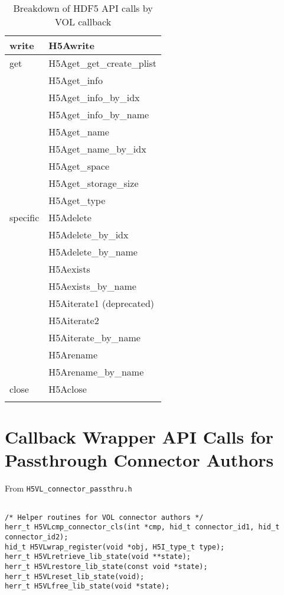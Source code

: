 \begin{appendices}
\begin{longtable}{ |l|>{\raggedright\arraybackslash}l| }
    \hline
    write & H5Awrite \\
    \hline
    get & H5Aget\_get\_create\_plist \\
        & H5Aget\_info \\
        & H5Aget\_info\_by\_idx \\
        & H5Aget\_info\_by\_name \\
        & H5Aget\_name \\
        & H5Aget\_name\_by\_idx \\
        & H5Aget\_space \\
        & H5Aget\_storage\_size \\
        & H5Aget\_type \\
    \hline
    specific & H5Adelete \\
             & H5Adelete\_by\_idx \\
             & H5Adelete\_by\_name \\
             & H5Aexists \\
             & H5Aexists\_by\_name \\
             & H5Aiterate1 (deprecated) \\
             & H5Aiterate2 \\
             & H5Aiterate\_by\_name \\
             & H5Arename \\
             & H5Arename\_by\_name \\
    \hline
    close & H5Aclose \\
    \hline
\caption{Breakdown of HDF5 API calls by VOL callback}
\end{longtable}

\pagebreak

\section{Callback Wrapper API Calls for Passthrough Connector Authors}
\label{sec:B}

From {\tt H5VL\_connector\_passthru.h}

\begin{lstlisting}

/* Helper routines for VOL connector authors */                                  
herr_t H5VLcmp_connector_cls(int *cmp, hid_t connector_id1, hid_t connector_id2);
hid_t H5VLwrap_register(void *obj, H5I_type_t type);                      
herr_t H5VLretrieve_lib_state(void **state);                              
herr_t H5VLrestore_lib_state(const void *state);                          
herr_t H5VLreset_lib_state(void);                                         
herr_t H5VLfree_lib_state(void *state);                                   
                                                                                 

\end{lstlisting}
\end{appendices}
